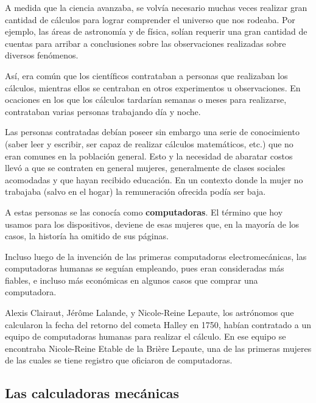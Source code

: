 A medida que la ciencia avanzaba, se volvía necesario muchas veces realizar gran
cantidad de cálculos para lograr comprender el universo que nos rodeaba. Por
ejemplo, las áreas de astronomía y de física, solían requerir una gran cantidad
de cuentas para arribar a conclusiones sobre las observaciones realizadas sobre
diversos fenómenos.

Así, era común que los científicos contrataban a personas que realizaban los
cálculos, mientras ellos se centraban en otros experimentos u observaciones. En
ocaciones en los que los cálculos tardarían semanas o meses para realizarse,
contrataban varias personas trabajando día y noche.

Las personas contratadas debían poseer sin embargo una serie de conocimiento
(saber leer y escribir, ser capaz de realizar cálculos matemáticos, etc.) que no
eran comunes en la población general. Esto y la necesidad de abaratar costos
llevó a que se contraten en general mujeres, generalmente de clases sociales
acomodadas y que hayan recibido educación. En un contexto donde la mujer no
trabajaba (salvo en el hogar) la remuneración ofrecida podía ser
baja.\cite[p23]{evans_2018}

A estas personas se las conocía como \textbf{computadoras}. El término que hoy
usamos para los dispositivos, deviene de esas mujeres que, en la mayoría de los
casos, la historía ha omitido de sus páginas.

Incluso luego de la invención de las primeras computadoras electromecánicas, las
computadoras humanas se seguían empleando, pues eran consideradas más fiables, e
incluso más económicas en algunos casos que comprar una computadora.

\begin{knowwhat}
    Alexis Clairaut, Jérôme Lalande, y Nicole-Reine Lepaute, los astrónomos que
    calcularon la fecha del retorno del cometa Halley en 1750, habían contratado
    a un equipo de computadoras humanas para realizar el cálculo. En ese equipo
    se encontraba Nicole-Reine Etable de la Brière Lepaute, una de las primeras
    mujeres de las cuales se tiene registro que oficiaron de computadoras.
\end{knowwhat}

\subsection{Las calculadoras mecánicas}
\label{chap:historia_computadoras:subsec:calculadoras_mecanicas}

